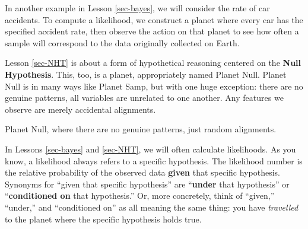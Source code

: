 \documentclass[
  letterpaper,
  DIV=11,
  numbers=noendperiod,
  oneside]{scrartcl}
\begin{document}
In another example in Lesson \ref{sec-bayes}, we will consider the rate
of car accidents. To compute a likelihood, we construct a planet where
every car has the specified accident rate, then observe the action on
that planet to see how often a sample will correspond to the data
originally collected on Earth.

Lesson \ref{sec-NHT} is about a form of hypothetical reasoning centered
on the \textbf{Null Hypothesis}. This, too, is a planet, appropriately
named Planet Null. Planet Null is in many ways like Planet Samp, but
with one huge exception: there are no genuine patterns, all variables
are unrelated to one another. Any features we observe are merely
accidental alignments.

\begin{marginfigure}


\caption{\label{fig-planet-earth}Planet Null, where there are no genuine
patterns, just random alignments.}

\end{marginfigure}%

In Lessons \ref{sec-bayes} and \ref{sec-NHT}, we will often calculate
likelihoods. As you know, a likelihood always refers to a specific
hypothesis. The likelihood number is the relative probability of the
observed data \textbf{given} that specific hypothesis. Synonyms for
``given that specific hypothesis'' are ``\textbf{under} that
hypothesis'' or ``\textbf{conditioned on} that hypothesis.'' Or, more
concretely, think of ``given,'' ``under,'' and ``conditioned on'' as all
meaning the same thing: you have \emph{travelled} to the planet where
the specific hypothesis holds true.
\end{document}

